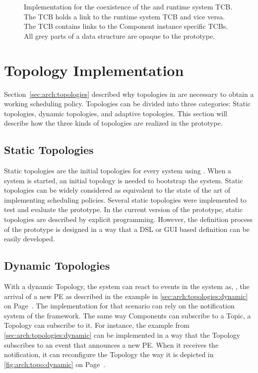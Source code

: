 \begin{figure}[t!]\centering
	\caption[Coexistence of the \cobas{} and runtime system TCB]{Implementation for the coexistence of the \cobas{} and runtime system \ac{TCB}. The \cobas{} \ac{TCB} holds a link to the runtime system \ac{TCB} and vice versa. The \ac{TCB} contains links to the Component instance specific \acp{TCB}. All grey parts of a data structure are opaque to the \cobas{} prototype.}%
	\label{fig:impl:pcb}
\end{figure}

\section{Topology Implementation}

Section~\ref{sec:arch:topologies} described why topologies in \cobas{} are necessary to obtain a working scheduling policy. Topologies can be divided into three categories: Static topologies, dynamic topologies, and adaptive topologies. This section will describe how the three kinds of topologies are realized in the \cobas{} prototype.

\subsection{Static Topologies}

Static topologies are the initial topologies for every system using \cobas{}. When a system is started, an initial topology is needed to bootstrap the system. Static topologies can be widely considered as equivalent to the state of the art of implementing scheduling policies. Several static topologies were implemented to test and evaluate the prototype. In the current version of the \cobas{} prototype, static topologies are described by explicit programming. However, the definition process of the prototype is designed in a way that a \ac{DSL} or GUI based definition can be easily developed.

\subsection{Dynamic Topologies}

With a dynamic Topology, the system can react to events in the system as, \eg{}, the arrival of a new \ac{PE} as described in the example in \cref{sec:arch:topologies:dynamic} on Page~\pageref{sec:arch:topologies:dynamic}. The implementation for that scenario can rely on the notification system of the \cobas{} framework. The same way Components can subscribe to a Topic, a Topology can subscribe to it. For instance, the example from \cref{sec:arch:topologies:dynamic} can be implemented in a way that the Topology subscribes to an event that announces a new \ac{PE}. When it receives the notification, it can reconfigure the Topology the way it is depicted in \cref{fig:arch:topo:dynamic} on Page~\pageref{fig:arch:topo:dynamic}.

